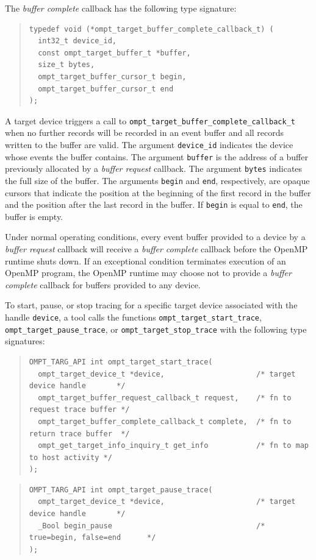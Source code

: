 \documentclass{article}
\begin{document}
The \emph{buffer complete} callback has the following type signature: 
\begin{quote}
\begin{verbatim}
typedef void (*ompt_target_buffer_complete_callback_t) (
  int32_t device_id, 
  const ompt_target_buffer_t *buffer,
  size_t bytes,
  ompt_target_buffer_cursor_t begin,
  ompt_target_buffer_cursor_t end
);
\end{verbatim}
\end{quote}
A target device triggers a call to \verb|ompt_target_buffer_complete_callback_t| when no further records will be recorded in an event buffer and all records written to the buffer are valid. 
The argument \verb|device_id| indicates the device whose events the buffer contains. The argument \verb|buffer| is the address of a buffer previously allocated by a \emph{buffer request} callback. The argument \verb|bytes| indicates the full size of the buffer. The arguments \verb|begin| and \verb|end|, respectively, are opaque cursors that indicate the position at the beginning of the first record in the buffer and the position after the last record in the buffer. If \verb|begin| is equal to \verb|end|, the buffer is empty. 

Under normal operating conditions, every event buffer provided to a device by a \emph{buffer request} callback will receive a \emph{buffer complete} callback before the OpenMP runtime shuts down. If an exceptional condition terminates  execution of an OpenMP program, the OpenMP runtime may choose not to provide a \emph{buffer complete} callback for buffers provided to any device.

To start, pause, or stop tracing for a specific target device associated with the handle \verb|device|, 
a tool calls the functions \verb|ompt_target_start_trace|, \verb|ompt_target_pause_trace|, or \verb|ompt_target_stop_trace| with the following type signatures:
\begin{quote}
\begin{verbatim}
OMPT_TARG_API int ompt_target_start_trace(
  ompt_target_device_t *device,                     /* target device handle       */
  ompt_target_buffer_request_callback_t request,    /* fn to request trace buffer */
  ompt_target_buffer_complete_callback_t complete,  /* fn to return trace buffer  */
  ompt_get_target_info_inquiry_t get_info           /* fn to map to host activity */
);
\end{verbatim}
\end{quote}

\begin{quote}
\begin{verbatim}
OMPT_TARG_API int ompt_target_pause_trace(
  ompt_target_device_t *device,                     /* target device handle       */
  _Bool begin_pause                                 /* true=begin, false=end      */
);
\end{verbatim}
\end{quote}
\end{document}
